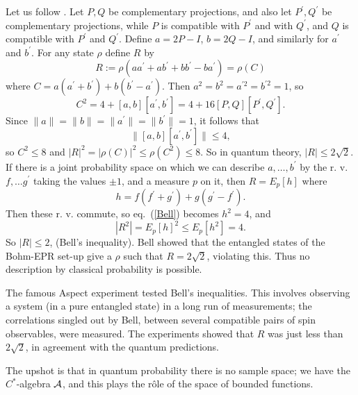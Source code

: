 Let us follow \cite{Landau,Kochen}. Let $P,Q$
be complementary projections, and also let $P^\prime,Q^\prime$ be
complementary projections, while $P$ is compatible with $P^\prime$
and with $Q^\prime$, and $Q$ is compatible with $P^\prime$ and
$Q^\prime$. Define $a=2P-I$, $b=2Q-I$, and similarly for $a^\prime$
and $b^\prime$. For any state $\rho$ define $R$ by
\[R:=\rho(aa^\prime+ab^\prime+bb^\prime-ba^\prime)=\rho(C)\]
where $C=a(a^\prime+b^\prime)+b(b^\prime-a^\prime)$. Then $a^2=b^2=a^{\prime
2}=b^{\prime 2}=1$, so
\begin{equation}
C^2=4+[a,b][a^\prime,b^\prime]=4+16[P,Q][P^\prime,Q^\prime].
\label{Bell}
\end{equation}
Since $\|a\|=\|b\|=\|a^\prime\|=\|b^\prime\|=1$, it follows that
\[\|[a,b][a^\prime,b^\prime]\|\leq 4,\]
so $C^2\leq 8$ and $|R|^2=|\rho(C)|^2\leq\rho(C^2)\leq 8$. So in quantum
theory, $|R|\leq 2\surd 2$.
If there is a joint probability space on which we can describe $a,\ldots,
b^\prime$ by the r. v. $f,\ldots g^\prime$ taking the values
$\pm 1$, and a measure $p$ on it, then $R=E_p[h]$ where
\[h=f(f^\prime+g^\prime)
+g(g^\prime-f^\prime).\]
Then these r. v. commute, so eq.~(\ref{Bell}) becomes $h^2=4$, and
\[|R^2|=E_p[h]^2\leq E_p[h^2]=4.\]
So $|R|\leq 2$, (Bell's inequality). Bell showed that the entangled
states of the Bohm-EPR set-up give a $\rho$ such that $R=2\surd 2$,
violating this. Thus no description by classical probability is possible.

The famous Aspect experiment tested Bell's inequalities.
This involves observing a system (in a pure entangled state) in a long run
of measurements; the correlations singled out by Bell,
between several compatible pairs of spin observables, were measured.
The experiments showed that $R$ was just less than $2\surd 2$, in
agreement with the quantum predictions.


The upshot is that in quantum probability there is no sample space;
we have the $C^*$-algebra ${\cal A}$, and this plays the r\^{o}le of
the space of
bounded functions.

